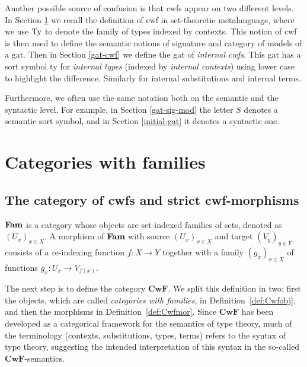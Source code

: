 \documentclass{lmcs}
\def\Cwf{\mathbf{CwF}}
\newcommand{\ty}{\mathrm{ty}}
\begin{document}
Another possible source of confusion is that cwfs appear on two different levels. In Section \ref{sec:def_cwf} we recall the definition of cwf in set-theoretic metalanguage, where we use $\mathrm{Ty}$ to denote the family of types indexed by contexts. This notion of cwf is then used to define the semantic notions of signature and category of models of a gat. Then in Section \ref{gat-cwf} we define the gat of {\em internal cwfs}. This gat has a sort symbol $\ty$ for {\em internal types} (indexed by {\em internal contexts}) using lower case to highlight the difference. Similarly for internal substitutions and internal terms.

Furthermore, we often use the same notation both on the semantic and the syntactic level. For example, in Section \ref{gat-sig-mod} the letter $S$ denotes a semantic sort symbol, and in Section \ref{initial-gat} it denotes a syntactic one.

\section{Categories with families}\label{sec:def_cwf}

\subsection{The category of cwfs and strict cwf-morphisms}


\begin{definition}\label{def:catFam}
$\textbf{Fam}$ is a category whose objects are
set-indexed families of sets, denoted as $(U_x)_{x\in X}$.
A morphism of $\textbf{Fam}$ with source $(U_x)_{x\in X}$ and target $(V_y)_{y\in Y}$
consists of a re-indexing function $f: X\to Y$ together with a family
$(g_x)_{x\in X}$ of functions $g_x : U_x \to V_{f(x)}$. %
\end{definition}

The next step is to define the category $\Cwf$.
We split this definition in two: first the objects,
which are called \emph{categories with families}, in Definition~\ref{def:Cwfobj},
and then the morphisms in Definition~\ref{def:Cwfmor}.
Since $\Cwf$ has been developed as a categorical framework for the semantics of
type theory, much of the terminology (contexts, substitutions,
types, terms) refers to the syntax of type theory,
suggesting the intended interpretation of this syntax in the
so-called $\Cwf$-semantics.
\end{document}
